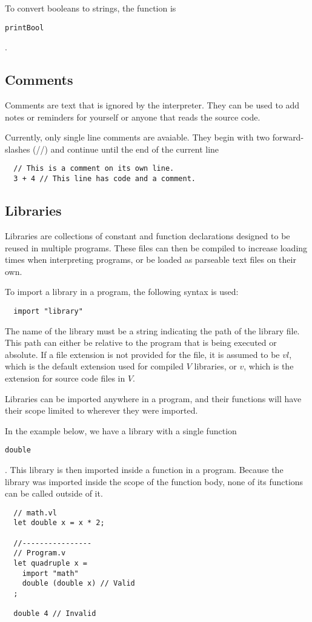 \documentclass{article}
\def\code#1{\begin{footnotesize}\texttt{#1}\end{footnotesize}}
\begin{document}
To convert booleans to strings, the function is \code{printBool}.

\subsection{Comments}
Comments are text that is ignored by the interpreter.
They can be used to add notes or reminders for yourself or anyone that reads the source code.

Currently, only single line comments are avaiable.
They begin with two forward-slashes (//) and continue until the end of the current line

\begin{lstlisting}
  // This is a comment on its own line.
  3 + 4 // This line has code and a comment.
\end{lstlisting}

\subsection{Libraries}

Libraries are collections of constant and function declarations designed to be reused in multiple programs.
These files can then be compiled to increase loading times when interpreting programs, or be loaded as parseable text files on their own.

To import a library in a program, the following syntax is used:

\begin{lstlisting}
  import "library"
\end{lstlisting}

The name of the library must be a string indicating the path of the library file.
This path can either be relative to the program that is being executed or absolute.
If a file extension is not provided for the file, it is assumed to be $vl$, which is the default extension used for compiled $V$ libraries, or $v$, which is  the extension for source code files in $V$.

Libraries can be imported anywhere in a program, and their functions will have their scope limited to wherever they were imported.

In the example below, we have a library with a single function \code{double}.
This library is then imported inside a function in a program.
Because the library was imported inside the scope of the function body, none of its functions can be called outside of it.

\begin{lstlisting}
  // math.vl
  let double x = x * 2;

  //----------------
  // Program.v
  let quadruple x =
    import "math"
    double (double x) // Valid
  ;

  double 4 // Invalid
\end{lstlisting}
\end{document}
